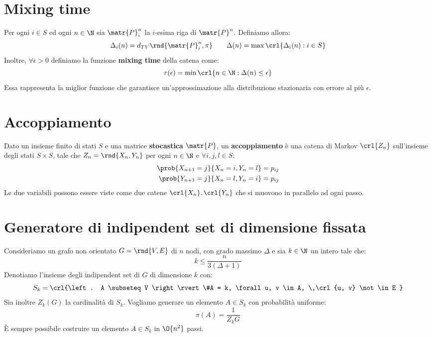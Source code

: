 \documentclass[\main/main.tex]{subfiles}
\begin{document}
\section{Mixing time}
\begin{definition}
  Per ogni \(i \in S\) ed ogni \(n \in \N \) sia \(\matr{P}^n_i\) la \(i\)-esima riga di \(\matr{P}^n\). Definiamo allora:
  \[
    \Delta_{i}(n) = d_{TV}\rnd{\matr{P}^n_i, \pi} \qquad \Delta(n) = \max\crl{\Delta_{i}(n): i \in S}
  \]
  Inoltre, \(\forall \epsilon > 0\) definiamo la funzione \textbf{mixing time} della catena come:
  \[
    \tau(\epsilon) = \min\crl{n \in \N: \Delta(n) \leq \epsilon}
  \]
  Essa rappresenta la miglior funzione che garantisce un'approssimazione alla distribuzione stazionaria con errore al più \(\epsilon\).
\end{definition}

\section{Accoppiamento}
\begin{definition}[Accoppiamento]
  Dato un insieme finito di stati \(S\) e una matrice \textbf{stocastica} \(\matr{P}\), un \textbf{accoppiamento} è una catena di Markov \(\crl{Z_n}\) sull'insieme degli stati \(S\times S\), tale che \(Z_n = \rnd{X_n, Y_n}\) per ogni \(n \in \N \) e \(\forall i,j,l \in S\):
  \begin{align*}
    \prob{X_{n+1} = j}{X_n=i, Y_n=l} & = p_{ij} \\
    \prob{Y_{n+1} = j}{X_n=l, Y_n=i} & = p_{ij}
  \end{align*}
  Le due variabili possono essere viste come due catene \(\crl{X_n}, \crl{Y_n}\) che si muovono in parallelo ad ogni passo.
\end{definition}

\section{Generatore di indipendent set di dimensione fissata}
Consideriamo un grafo non orientato \(G = \rnd{V, E}\) di \(n\) nodi, con grado massimo \(\Delta \) e sia \(k \in \N \) un intero tale che:
\[
  k \leq \frac{n}{3(\Delta + 1)}
\]
Denotiamo l'insieme degli indipendent set di \(G\) di dimensione \(k\) con:
\[
  S_k = \crl{\left. A \subseteq V \right\rvert \#A = k, \forall u, v \in A, \,\crl{u, v} \not\in E }
\]
Sia inoltre \(Z_k(G)\) la cardinalità di \(S_k\). Vogliamo generare un elemento \(A \in S_k\) con probabilità uniforme:
\[
  \pi(A) = \frac{1}{Z_k{G}}
\]
È sempre possibile costruire un elemento \(A \in S_k\) in \(\O{n^2}\) passi.
\end{document}
